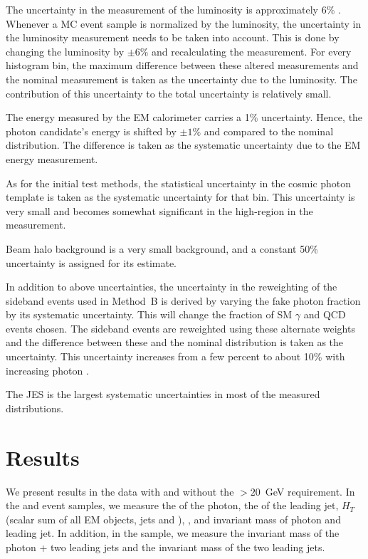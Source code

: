 \documentclass[12pt,twoside,letterpaper,doublespace]{article}
\begin{document}
The uncertainty in the measurement of the luminosity is approximately 6\% \cite{ref:CLCuncertainty}. Whenever a MC event sample is normalized by the luminosity, the uncertainty in the luminosity measurement needs to be taken into account. This is done by changing the luminosity by $\pm 6\%$ and recalculating the measurement. For every histogram bin, the maximum difference between these altered measurements and the nominal measurement is taken as the uncertainty due to the luminosity. The contribution of this uncertainty to the total uncertainty is relatively small.

The energy measured by the EM calorimeter carries a 1\% uncertainty. Hence, the photon candidate's energy is shifted by $\pm1\%$ and compared to the nominal distribution. The difference is taken as the systematic uncertainty due to the EM energy measurement.

As for the initial test methods, the statistical uncertainty in the cosmic photon template is taken as the systematic uncertainty for that bin. This uncertainty is very small and becomes somewhat significant in the high-\met region in the \met measurement.

Beam halo background is a very small background, and a constant 50\% uncertainty is assigned for its estimate.

In addition to above uncertainties, the uncertainty in the reweighting of the sideband events used in Method~B is derived by varying the fake photon fraction by its systematic uncertainty. This will change the fraction of SM $\gamma$ and QCD events chosen. The sideband events are reweighted using these alternate weights and the difference between these and the nominal distribution is taken as the uncertainty. This uncertainty increases from a few percent to about 10\% with increasing photon \et.

The JES is the largest systematic uncertainties in most of the measured distributions.

\section{Results}
\label{sec:PrelResults}
We present results in the \phojets data with and without the \met$>20$~GeV requirement.   In the \phoonejet and \photwojet event samples, we measure the \et of the photon, the \et of the leading jet, $H_{T}$ (scalar sum of all EM objects, jets and \met), \met, and invariant mass of photon and leading jet. In addition, in the \photwojet sample, we measure the invariant mass of the photon + two leading jets and the invariant mass of the two leading jets.
\end{document}
